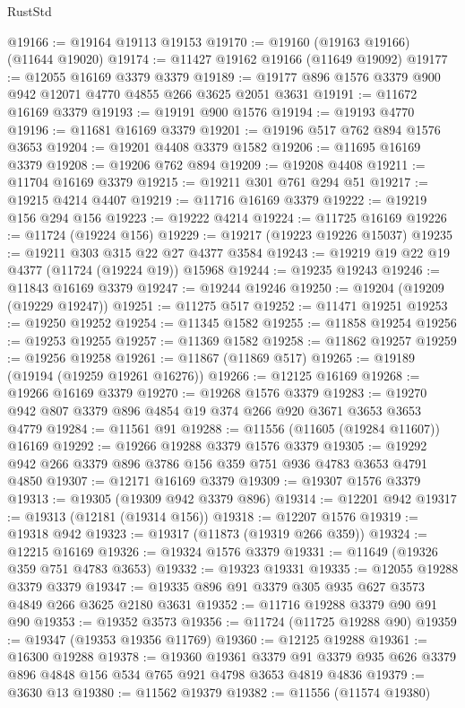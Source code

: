 \begin{lexlean}{RustStd}
\begin{coremodule}
@19166 := @19164 @19113 @19153
@19170 := @19160 (@19163 @19166) (@11644 @19020)
@19174 := @11427 @19162 @19166 (@11649 @19092)
@19177 := @12055 @16169 @3379 @3379
@19189 := @19177 @896 @1576 @3379 @900 @942 @12071 @4770 @4855 @266 @3625 @2051 @3631
@19191 := @11672 @16169 @3379
@19193 := @19191 @900 @1576
@19194 := @19193 @4770
@19196 := @11681 @16169 @3379
@19201 := @19196 @517 @762 @894 @1576 @3653
@19204 := @19201 @4408 @3379 @1582
@19206 := @11695 @16169 @3379
@19208 := @19206 @762 @894
@19209 := @19208 @4408
@19211 := @11704 @16169 @3379
@19215 := @19211 @301 @761 @294 @51
@19217 := @19215 @4214 @4407
@19219 := @11716 @16169 @3379
@19222 := @19219 @156 @294 @156
@19223 := @19222 @4214
@19224 := @11725 @16169
@19226 := @11724 (@19224 @156)
@19229 := @19217 (@19223 @19226 @15037)
@19235 := @19211 @303 @315 @22 @27 @4377 @3584
@19243 := @19219 @19 @22 @19 @4377 (@11724 (@19224 @19)) @15968
@19244 := @19235 @19243
@19246 := @11843 @16169 @3379
@19247 := @19244 @19246
@19250 := @19204 (@19209 (@19229 @19247))
@19251 := @11275 @517
@19252 := @11471 @19251
@19253 := @19250 @19252
@19254 := @11345 @1582
@19255 := @11858 @19254
@19256 := @19253 @19255
@19257 := @11369 @1582
@19258 := @11862 @19257
@19259 := @19256 @19258
@19261 := @11867 (@11869 @517)
@19265 := @19189 (@19194 (@19259 @19261 @16276))
@19266 := @12125 @16169
@19268 := @19266 @16169 @3379
@19270 := @19268 @1576 @3379
@19283 := @19270 @942 @807 @3379 @896 @4854 @19 @374 @266 @920 @3671 @3653 @3653 @4779
@19284 := @11561 @91
@19288 := @11556 (@11605 (@19284 @11607)) @16169
@19292 := @19266 @19288 @3379 @1576 @3379
@19305 := @19292 @942 @266 @3379 @896 @3786 @156 @359 @751 @936 @4783 @3653 @4791 @4850
@19307 := @12171 @16169 @3379
@19309 := @19307 @1576 @3379
@19313 := @19305 (@19309 @942 @3379 @896)
@19314 := @12201 @942
@19317 := @19313 (@12181 (@19314 @156))
@19318 := @12207 @1576
@19319 := @19318 @942
@19323 := @19317 (@11873 (@19319 @266 @359))
@19324 := @12215 @16169
@19326 := @19324 @1576 @3379
@19331 := @11649 (@19326 @359 @751 @4783 @3653)
@19332 := @19323 @19331
@19335 := @12055 @19288 @3379 @3379
@19347 := @19335 @896 @91 @3379 @305 @935 @627 @3573 @4849 @266 @3625 @2180 @3631
@19352 := @11716 @19288 @3379 @90 @91 @90
@19353 := @19352 @3573
@19356 := @11724 (@11725 @19288 @90)
@19359 := @19347 (@19353 @19356 @11769)
@19360 := @12125 @19288
@19361 := @16300 @19288
@19378 := @19360
    @19361
    @3379
    @91
    @3379
    @935
    @626
    @3379
    @896
    @4848
    @156
    @534
    @765
    @921
    @4798
    @3653
    @4819
    @4836
@19379 := @3630 @13
@19380 := @11562 @19379
@19382 := @11556 (@11574 @19380)

\end{coremodule}
\end{lexlean}
